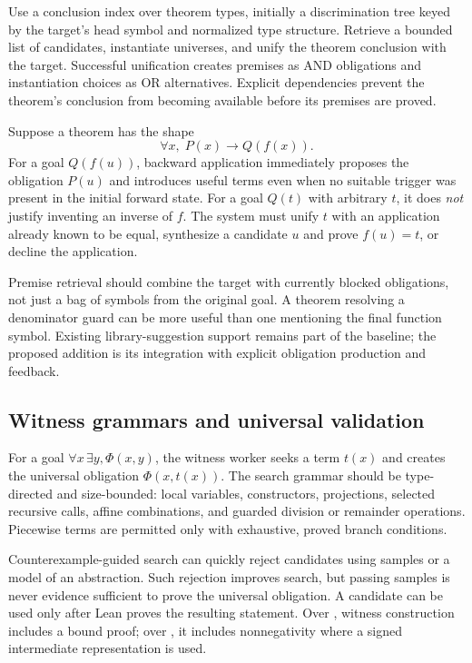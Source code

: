 Use a conclusion index over theorem types, initially a discrimination tree keyed by the target's head symbol and normalized type structure. Retrieve a bounded list of candidates, instantiate universes, and unify the theorem conclusion with the target. Successful unification creates premises as AND obligations and instantiation choices as OR alternatives. Explicit dependencies prevent the theorem's conclusion from becoming available before its premises are proved.

Suppose a theorem has the shape
\[
  \forall x,\;P(x)\to Q(f(x)).
\]
For a goal $Q(f(u))$, backward application immediately proposes the obligation $P(u)$ and introduces useful terms even when no suitable trigger was present in the initial forward state. For a goal $Q(t)$ with arbitrary $t$, it does \emph{not} justify inventing an inverse of $f$. The system must unify $t$ with an application already known to be equal, synthesize a candidate $u$ and prove $f(u)=t$, or decline the application.

Premise retrieval should combine the target with currently blocked obligations, not just a bag of symbols from the original goal. A theorem resolving a denominator guard can be more useful than one mentioning the final function symbol. Existing library-suggestion support remains part of the baseline; the proposed addition is its integration with explicit obligation production and feedback.

\subsection{Witness grammars and universal validation}

For a goal $\forall x\,\exists y,\Phi(x,y)$, the witness worker seeks a term $t(x)$ and creates the universal obligation $\Phi(x,t(x))$. The search grammar should be type-directed and size-bounded: local variables, constructors, projections, selected recursive calls, affine combinations, and guarded division or remainder operations. Piecewise terms are permitted only with exhaustive, proved branch conditions.

Counterexample-guided search can quickly reject candidates using samples or a model of an abstraction. Such rejection improves search, but passing samples is never evidence sufficient to prove the universal obligation. A candidate can be used only after Lean proves the resulting statement. Over , witness construction includes a bound proof; over , it includes nonnegativity where a signed intermediate representation is used.

